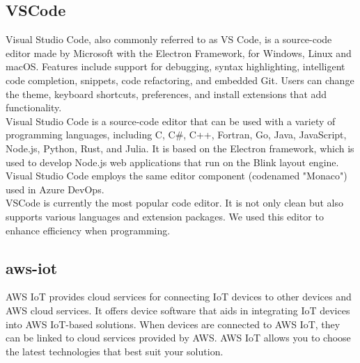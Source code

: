\subsection{\textbf{VSCode}}
\cite{vscode} Visual Studio Code, also commonly referred to as VS Code, is a source-code editor made by Microsoft with the Electron Framework, for Windows, Linux and macOS. Features include support for debugging, syntax highlighting, intelligent code completion, snippets, code refactoring, and embedded Git. Users can change the theme, keyboard shortcuts, preferences, and install extensions that add functionality.
\\

Visual Studio Code is a source-code editor that can be used with a variety of programming languages, including C, C\#, C++, Fortran, Go, Java, JavaScript, Node.js, Python, Rust, and Julia. It is based on the Electron framework, which is used to develop Node.js web applications that run on the Blink layout engine. Visual Studio Code employs the same editor component (codenamed "Monaco") used in Azure DevOps.
\\

VSCode is currently the most popular code editor. It is not only clean but also supports various languages and extension packages. We used this editor to enhance efficiency when programming.\\

\subsection{\textbf{aws-iot}}
\cite{awsiot}
AWS IoT provides cloud services for connecting IoT devices to other devices and AWS cloud services. It offers device software that aids in integrating IoT devices into AWS IoT-based solutions. When devices are connected to AWS IoT, they can be linked to cloud services provided by AWS. AWS IoT allows you to choose the latest technologies that best suit your solution.
\\

